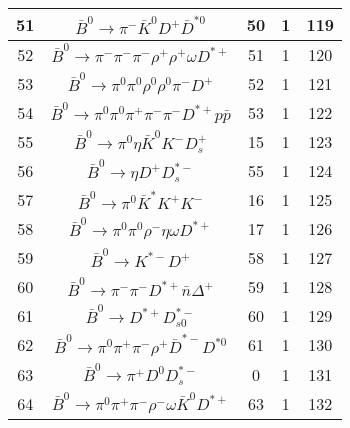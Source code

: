 \documentclass[landscape]{article}
\begin{document}
\begin{table}[htbp!]
\begin{tabular}{|c|c|c|c|c|}
\hline
51 & $ \bar{B}^{0} \rightarrow \pi^{-} \bar{K}^{0} D^{+} \bar{D}^{*0} $ & 50 & 1 & 119 \\
\hline
52 & $ \bar{B}^{0} \rightarrow \pi^{-} \pi^{-} \pi^{-} \rho^{+} \rho^{+} \omega D^{*+} $ & 51 & 1 & 120 \\
\hline
53 & $ \bar{B}^{0} \rightarrow \pi^{0} \pi^{0} \rho^{0} \rho^{0} \pi^{-} D^{+} $ & 52 & 1 & 121 \\
\hline
54 & $ \bar{B}^{0} \rightarrow \pi^{0} \pi^{0} \pi^{+} \pi^{-} \pi^{-} D^{*+} p \bar{p} $ & 53 & 1 & 122 \\
\hline
55 & $ \bar{B}^{0} \rightarrow \pi^{0} \eta \bar{K}^{0} K^{-} D_{s}^{+} $ & 15 & 1 & 123 \\
\hline
56 & $ \bar{B}^{0} \rightarrow \eta D^{+} D_{s}^{*-} $ & 55 & 1 & 124 \\
\hline
57 & $ \bar{B}^{0} \rightarrow \pi^{0} \bar{K}^{*} K^{+} K^{-} $ & 16 & 1 & 125 \\
\hline
58 & $ \bar{B}^{0} \rightarrow \pi^{0} \pi^{0} \rho^{-} \eta \omega D^{*+} $ & 17 & 1 & 126 \\
\hline
59 & $ \bar{B}^{0} \rightarrow K^{*-} D^{+} $ & 58 & 1 & 127 \\
\hline
60 & $ \bar{B}^{0} \rightarrow \pi^{-} \pi^{-} D^{*+} \bar{n} \Delta^{+} $ & 59 & 1 & 128 \\
\hline
61 & $ \bar{B}^{0} \rightarrow D^{*+} D_{s0}^{*-} $ & 60 & 1 & 129 \\
\hline
62 & $ \bar{B}^{0} \rightarrow \pi^{0} \pi^{+} \pi^{-} \rho^{+} \bar{D}^{*-} D^{*0} $ & 61 & 1 & 130 \\
\hline
63 & $ \bar{B}^{0} \rightarrow \pi^{+} D^{0} D_{s}^{*-} $ & 0 & 1 & 131 \\
\hline
64 & $ \bar{B}^{0} \rightarrow \pi^{0} \pi^{+} \pi^{-} \rho^{-} \omega \bar{K}^{0} D^{*+} $ & 63 & 1 & 132 \\
\hline
\end{tabular}
\end{table}

\clearpage
\end{document}
